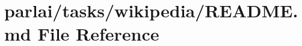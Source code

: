 \hypertarget{parlai_2tasks_2wikipedia_2README_8md}{}\section{parlai/tasks/wikipedia/\+R\+E\+A\+D\+ME.md File Reference}
\label{parlai_2tasks_2wikipedia_2README_8md}
